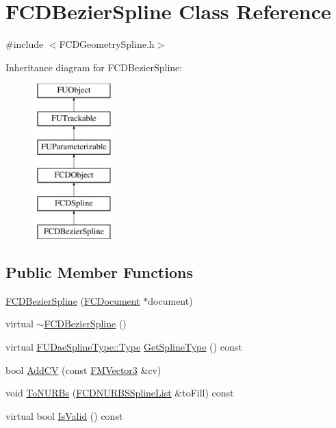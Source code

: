 \hypertarget{classFCDBezierSpline}{
\section{FCDBezierSpline Class Reference}
\label{classFCDBezierSpline}
}


{\ttfamily \#include $<$FCDGeometrySpline.h$>$}

Inheritance diagram for FCDBezierSpline:\begin{figure}[H]
\begin{center}
\leavevmode
\includegraphics[height=6.000000cm]{classFCDBezierSpline}
\end{center}
\end{figure}
\subsection*{Public Member Functions}
\begin{DoxyCompactItemize}
\item 
\hyperlink{classFCDBezierSpline_aa3f49b89e0b97b58ffb4120b9abe2727}{FCDBezierSpline} (\hyperlink{classFCDocument}{FCDocument} $\ast$document)
\item 
virtual \hyperlink{classFCDBezierSpline_a090f86ef30c4135479d244def74c496e}{$\sim$FCDBezierSpline} ()
\item 
virtual \hyperlink{namespaceFUDaeSplineType_a7db2b90bcd53814239cc29f64754d0ab}{FUDaeSplineType::Type} \hyperlink{classFCDBezierSpline_a83442735cc73d09922891e94a96fa373}{GetSplineType} () const 
\item 
bool \hyperlink{classFCDBezierSpline_afe3b6399781f248db5d25c2772805e11}{AddCV} (const \hyperlink{classFMVector3}{FMVector3} \&cv)
\item 
void \hyperlink{classFCDBezierSpline_ab76408f07ee6105394bbbfb7f84d8fd2}{ToNURBs} (\hyperlink{classfm_1_1pvector}{FCDNURBSSplineList} \&toFill) const 
\item 
virtual bool \hyperlink{classFCDBezierSpline_abd299d3c4d31c253333ff861074c6816}{IsValid} () const 
\end{DoxyCompactItemize}


